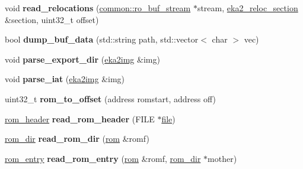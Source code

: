 \begin{DoxyCompactItemize}
\item 
\mbox{\label{namespaceeka2l1_1_1loader_a4955df981d3c5937a3e4a74dfe968bbe}} 
void {\bfseries read\+\_\+relocations} (\mbox{\hyperlink{classeka2l1_1_1common_1_1ro__buf__stream}{common\+::ro\+\_\+buf\+\_\+stream}} $\ast$stream, \mbox{\hyperlink{structeka2l1_1_1loader_1_1eka2__reloc__section}{eka2\+\_\+reloc\+\_\+section}} \&section, uint32\+\_\+t offset)
\item 
\mbox{\label{namespaceeka2l1_1_1loader_ab8febb3f9f14cb31ddd66627e45252ef}} 
bool {\bfseries dump\+\_\+buf\+\_\+data} (std\+::string path, std\+::vector$<$ char $>$ vec)
\item 
\mbox{\label{namespaceeka2l1_1_1loader_a43885b2db7fa538519654c85579dbf6a}} 
void {\bfseries parse\+\_\+export\+\_\+dir} (\mbox{\hyperlink{structeka2l1_1_1loader_1_1eka2img}{eka2img}} \&img)
\item 
\mbox{\label{namespaceeka2l1_1_1loader_a6a36d29917390f8bd6950248c33faf46}} 
void {\bfseries parse\+\_\+iat} (\mbox{\hyperlink{structeka2l1_1_1loader_1_1eka2img}{eka2img}} \&img)
\item 
\mbox{\label{namespaceeka2l1_1_1loader_af070da9acf4abbeeb1a5690f4ec1aef4}} 
uint32\+\_\+t {\bfseries rom\+\_\+to\+\_\+offset} (address romstart, address off)
\item 
\mbox{\label{namespaceeka2l1_1_1loader_a9b58bba20563b15d34243528d99b6b43}} 
\mbox{\hyperlink{structeka2l1_1_1loader_1_1rom__header}{rom\+\_\+header}} {\bfseries read\+\_\+rom\+\_\+header} (F\+I\+LE $\ast$\mbox{\hyperlink{structeka2l1_1_1file}{file}})
\item 
\mbox{\label{namespaceeka2l1_1_1loader_a5809f7a118b9afc323ecab1f9601b074}} 
\mbox{\hyperlink{structeka2l1_1_1loader_1_1rom__dir}{rom\+\_\+dir}} {\bfseries read\+\_\+rom\+\_\+dir} (\mbox{\hyperlink{structeka2l1_1_1loader_1_1rom}{rom}} \&romf)
\item 
\mbox{\label{namespaceeka2l1_1_1loader_a069dcc36924031975aa268741c8a1ee3}} 
\mbox{\hyperlink{structeka2l1_1_1loader_1_1rom__entry}{rom\+\_\+entry}} {\bfseries read\+\_\+rom\+\_\+entry} (\mbox{\hyperlink{structeka2l1_1_1loader_1_1rom}{rom}} \&romf, \mbox{\hyperlink{structeka2l1_1_1loader_1_1rom__dir}{rom\+\_\+dir}} $\ast$mother)

\end{DoxyCompactItemize}
